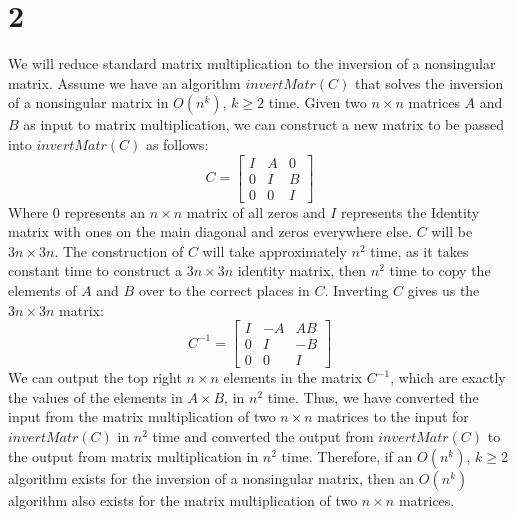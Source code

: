 \documentclass[letterpaper,notitlepage,twoside]{article}
\begin{document}
\section*{2}
We will reduce standard matrix multiplication to the inversion of a nonsingular matrix. Assume we have an algorithm $invertMatr(C)$ that solves the inversion of a nonsingular matrix in $O(n^k)$, $k \geq 2$ time. Given two $n \times n$ matrices $A$ and $B$ as input to matrix multiplication, we can construct a new matrix to be passed into $invertMatr(C)$ as follows:
\[C = \begin{bmatrix} I & A & 0 \\ 0 & I & B \\ 0 & 0 & I \end{bmatrix} \]
Where $0$ represents an $n \times n$ matrix of all zeros and $I$ represents the Identity matrix with ones on the main diagonal and zeros everywhere else. $C$ will be $3n \times 3n$. The construction of $C$ will take approximately $n^2$ time, as it takes constant time to construct a $3n \times 3n$ identity matrix, then $n^2$ time to copy the elements of $A$ and $B$ over to the correct places in $C$. Inverting $C$ gives us the $3n \times 3n$ matrix: \\
\[C^{-1} = \begin{bmatrix} I & -A & AB \\ 0 & I & -B \\ 0 & 0 & I \end{bmatrix} \]
We can output the top right $n \times n$ elements in the matrix $C^{-1}$, which are exactly the values of the elements in $A \times B$, in $n^2$ time. Thus, we have converted the input from the matrix multiplication of two $n \times n$ matrices to the input for $invertMatr(C)$ in $n^2$ time and converted the output from $invertMatr(C)$ to the output from matrix multiplication in $n^2$ time. Therefore, if an $O(n^k)$, $k \geq 2$ algorithm exists for the inversion of a nonsingular matrix, then an $O(n^k)$ algorithm also exists for the matrix multiplication of two $n \times n$ matrices. 
\end{document}
